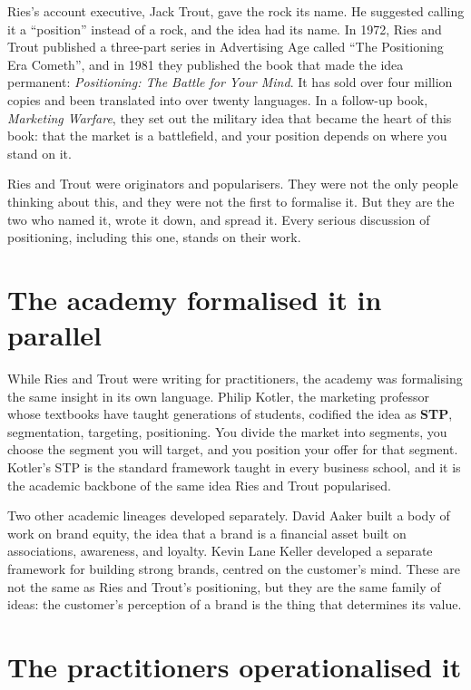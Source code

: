\documentclass[10pt,twoside,openany]{memoir}
\newcommand{\needspacehead}{\needspace{4\baselineskip}}
\let\oldsection\section
\renewcommand{\section}{\needspacehead\oldsection}
\begin{document}
Ries's account executive, Jack Trout, gave the rock its name. He
suggested calling it a ``position'' instead of a rock, and the idea had
its name. In 1972, Ries and Trout published a three-part series in
Advertising Age called ``The Positioning Era Cometh''\cite{ries1972},
and in 1981 they published the book that made the idea permanent:
\emph{Positioning: The Battle for Your Mind}\cite{ries1981}. It has sold
over four million copies and been translated into over twenty languages.
In a follow-up book, \emph{Marketing Warfare}\cite{ries1986}, they set
out the military idea that became the heart of this book: that the
market is a battlefield, and your position depends on where you stand on
it.

Ries and Trout were originators and popularisers. They were not the only
people thinking about this, and they were not the first to formalise it.
But they are the two who named it, wrote it down, and spread it. Every
serious discussion of positioning, including this one, stands on their
work.

\section{The academy formalised it in
parallel}\label{the-academy-formalised-it-in-parallel}

While Ries and Trout were writing for practitioners, the academy was
formalising the same insight in its own language. Philip Kotler, the
marketing professor whose textbooks have taught generations of students,
codified the idea as \textbf{STP}\cite{kotler2016}, segmentation,
targeting, positioning. You divide the market into segments, you choose
the segment you will target, and you position your offer for that
segment. Kotler's STP is the standard framework taught in every business
school, and it is the academic backbone of the same idea Ries and Trout
popularised.

Two other academic lineages developed separately. David Aaker built a
body of work on brand equity, the idea that a brand is a financial asset
built on associations, awareness, and loyalty.\cite{aaker1996} Kevin
Lane Keller developed a separate framework for building strong brands,
centred on the customer's mind.\cite{keller1998} These are not the same
as Ries and Trout's positioning, but they are the same family of ideas:
the customer's perception of a brand is the thing that determines its
value.

\section{The practitioners operationalised
it}\label{the-practitioners-operationalised-it}
\end{document}
